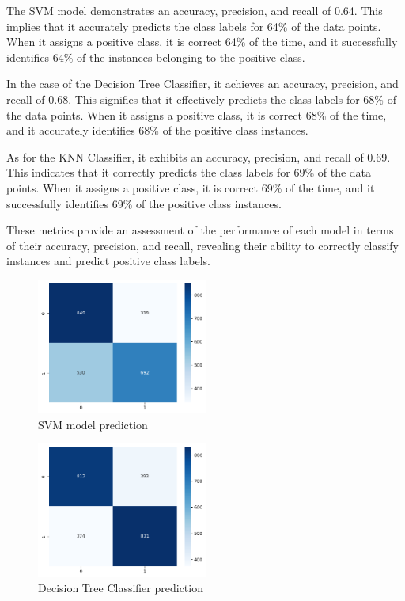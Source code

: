 
The SVM model demonstrates an accuracy, precision, and recall of 0.64. This implies that it accurately predicts the class labels for 64\% of the data points. When it assigns a positive class, it is correct 64\% of the time, and it successfully identifies 64\% of the instances belonging to the positive class.

In the case of the Decision Tree Classifier, it achieves an accuracy, precision, and recall of 0.68. This signifies that it effectively predicts the class labels for 68\% of the data points. When it assigns a positive class, it is correct 68\% of the time, and it accurately identifies 68\% of the positive class instances.

As for the KNN Classifier, it exhibits an accuracy, precision, and recall of 0.69. This indicates that it correctly predicts the class labels for 69\% of the data points. When it assigns a positive class, it is correct 69\% of the time, and it successfully identifies 69\% of the positive class instances.

These metrics provide an assessment of the performance of each model in terms of their accuracy, precision, and recall, revealing their ability to correctly classify instances and predict positive class labels.

\begin{figure}
\includegraphics[width=0.5\textwidth]{img/svm_pred.png}
\caption{SVM model prediction}
\label{fig:svm_cm}
\end{figure}

\begin{figure}
\includegraphics[width=0.5\textwidth]{img/dec_pred.png}
\caption{Decision Tree Classifier prediction}
\label{fig:dec_cm}
\end{figure}

